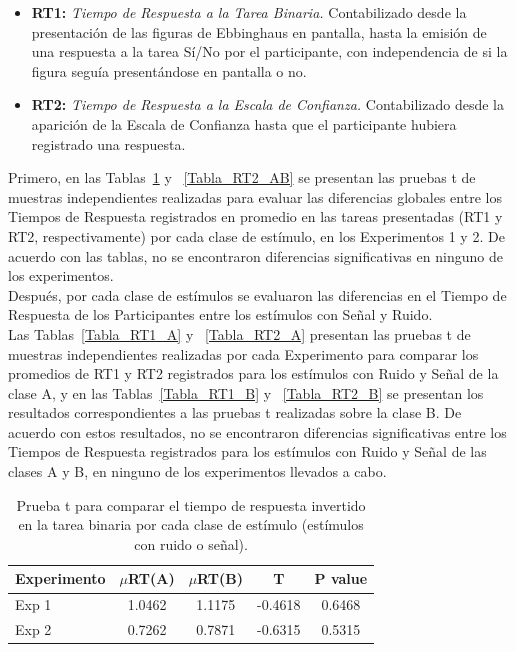 \begin{itemize}
\item \textbf{RT1:} \textit{Tiempo de Respuesta a la Tarea Binaria.}  Contabilizado desde la presentación de las figuras de Ebbinghaus en pantalla, hasta la emisión de una respuesta a la tarea Sí/No por el participante, con independencia de si la figura seguía presentándose en pantalla o no.\\

\item \textbf{RT2:} \textit{Tiempo de Respuesta a la Escala de Confianza.} Contabilizado desde la aparición de la Escala de Confianza hasta que el participante hubiera registrado una respuesta.\\
\end{itemize}

Primero, en las Tablas~\ref{Tabla_RT1_AB} y ~\ref{Tabla_RT2_AB} se presentan las pruebas t de muestras independientes realizadas para evaluar las diferencias globales entre los Tiempos de Respuesta registrados en promedio en las tareas presentadas (RT1 y RT2, respectivamente) por cada clase de estímulo, en los Experimentos 1 y 2. De acuerdo con las tablas, no se encontraron diferencias significativas en ninguno de los experimentos.\\

Después, por cada clase de estímulos se evaluaron las diferencias en el Tiempo de Respuesta de los Participantes entre los estímulos con Señal y Ruido.\\

Las Tablas~\ref{Tabla_RT1_A} y ~\ref{Tabla_RT2_A} presentan las pruebas t de muestras independientes realizadas por cada Experimento para comparar los promedios de RT1 y RT2 registrados para los estímulos con Ruido y Señal de la clase A, y en las Tablas~\ref{Tabla_RT1_B} y ~\ref{Tabla_RT2_B} se presentan los resultados correspondientes a las pruebas t realizadas sobre la clase B. De acuerdo con estos resultados, no se encontraron diferencias significativas entre los Tiempos de Respuesta registrados para los estímulos con Ruido y Señal de las clases A y B, en ninguno de los experimentos llevados a cabo.\\



\begin{table}[h]
\caption[Prueba t para comparar el tiempo de respuesta invertido en la tarea binaria por cada clase de estímulo (estímulos con ruido o señal)]{Prueba t para comparar el tiempo de respuesta invertido en la tarea binaria por cada clase de estímulo (estímulos con ruido o señal).}
\label{Tabla_RT1_AB}
\centering
\begin{tabular}{l |  c c c c}
\toprule
\textbf{Experimento} & \textbf{$\mu$RT(A)} & \textbf{$\mu$RT(B)} & \textbf{T} & \textbf{P value}\\
\midrule
Exp 1 & 1.0462 & 1.1175 & -0.4618 & 0.6468 \\
Exp 2 & 0.7262 & 0.7871 & -0.6315 & 0.5315 \\
\bottomrule
\end{tabular}
\end{table}


